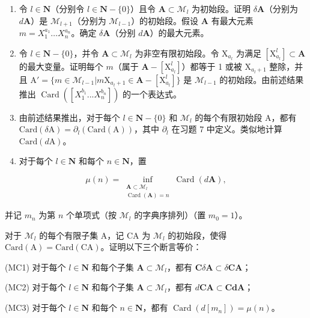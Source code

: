 \begin{enumerate}
\def\labelenumi{\alph{enumi})}
\item
  令 \(l \in \mathbf{N}\)（分别令 \(l \in \mathbf{N} - \{0\}\)）且令 \(\mathbf{A} \subset \mathcal{M}_l\) 为初始段。证明 \(\delta \mathbf{A}\)（分别为 \(d\mathbf{A}\)）是 \(\mathcal{M}_{l+1}\)（分别为 \(\mathcal{M}_{l-1}\)）的初始段。假设 \(\mathbf{A}\) 有最大元素 \(m = X_1^{a_1} \ldots X_n^{a_n}\)。确定 \(\delta \mathbf{A}\)（分别 \(d\mathbf{A}\)）的最大元素。
\item
  令 \(l \in \mathbf{N} - \{0\}\)，并令 \(\mathbf{A} \subset \mathcal{M}_l\) 为非空有限初始段。令 \(\mathrm{X}_{a_l}\) 为满足 \([\mathrm{X}_{a_l}^l] \subset \mathbf{A}\) 的最大变量。证明每个 \(m\)（属于 \(\mathbf{A} - [\mathrm{X}_{a_l}^l]\)）都等于 1 或被 \(\mathrm{X}_{a_l + 1}\) 整除，并且 \(\mathrm{A}' = \{m \in \mathcal{M}_{l-1}|m\mathrm{X}_{a_l + 1} \in \mathbf{A} - [\mathrm{X}_{a_l}^l]\}\) 是 \(\mathcal{M}_{l-1}\) 的初始段。由前述结果推出 \(\operatorname{Card}([X_1^{b_1} ... X_n^{b_n}])\) 的一个表达式。
\item
  由前述结果推出，对于每个 \(l \in \mathbf{N} - \{0\}\) 和 \(\mathcal{M}_l\) 的每个有限初始段 A，都有 \(\text{Card}(\delta\text{A}) = \partial_l(\text{Card}(\text{A}))\)，其中 \(\partial_l\) 在习题 7 中定义。类似地计算 \(\text{Card}(d\text{A})\)。
\item
  对于每个 \(l \in \mathbf{N}\) 和每个 \(n \in \mathbf{N}\)，置
\end{enumerate}

\[
\mu (n) = \inf_{\substack{\mathbf{A}\subset \mathcal{M}_{l}\\ \operatorname{Card}(\mathbf{A}) = n}}\operatorname{Card}(d\mathbf{A}),
\]

并记 \(m_{n}\) 为第 \(n\) 个单项式（按 \(\mathcal{M}_{l}\) 的字典序排列）（置 \(m_{0}=1\)）。

对于 \(\mathcal{M}_{l}\) 的每个有限子集 A，记 CA 为 \(\mathcal{M}_{l}\) 的初始段，使得 \(\mathrm{Card(A)} = \mathrm{Card(CA)}\)。证明以下三个断言等价：

(MC1) 对于每个 \(l \in \mathbf{N}\) 和每个子集 \(\mathbf{A} \subset \mathcal{M}_l\)，都有 \(\mathbf{C}\delta \mathbf{A} \subset \delta \mathbf{CA}\)；

(MC2) 对于每个 \(l \in \mathbf{N}\) 和每个子集 \(\mathbf{A} \subset \mathcal{M}_l\)，都有 \(d\mathbf{CA} \subset \mathbf{CdA}\)；

(MC3) 对于每个 \(l \in \mathbf{N}\) 和每个 \(n \in \mathbf{N}\)，都有 \(\operatorname{Card}(d[m_n]) = \mu(n)\)。

